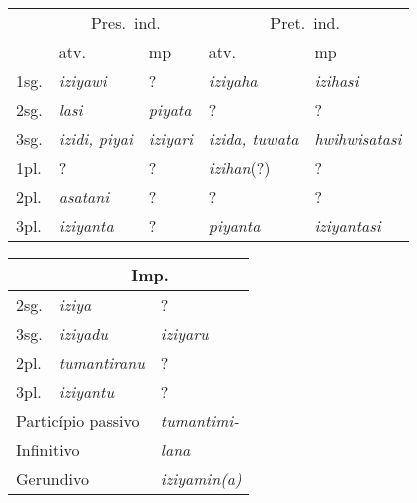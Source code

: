 \begin{center}
	\begin{tabular}[c]{lll|ll}
		\toprule
		     & \multicolumn{2}{c|}{Pres.\ ind.} & \multicolumn{2}{c}{Pret.\ ind.}                                              \\

		     & atv.\emph{}                      & mp\emph{}
		     & atv.\emph{}                      & mp\emph{}                                                                    \\
		\midrule
		1sg. & \emph{iziyawi}                   & {?}\emph{}                      & \emph{iziyaha}       & \emph{izihasi}      \\
		2sg. & \emph{lasi}                      & \emph{piyata}                   & {?}\emph{}           & {?}                 \\
		3sg. & \emph{izidi, piyai}              & \emph{iziyari}                  & \emph{izida, tuwata} & \emph{hwihwisatasi} \\
		1pl. & {?}                              & {?}                             & \emph{izihan}{(?)}   & {?}                 \\
		2pl. & \emph{asatani}                   & {?}                             & {?}                  & {?}                 \\
		3pl. & \emph{iziyanta}                  & {?}                             & \emph{piyanta}       & \emph{iziyantasi}   \\
		\bottomrule
	\end{tabular}
\end{center}


\begin{center}
	\begin{tabular}[c]{lll}
		\toprule
		                                        & \multicolumn{2}{c}{Imp.}                  \\
		\midrule
		2sg.                                    & \emph{iziya}             & {?}            \\
		3sg.                                    & \emph{iziyadu}           & \emph{iziyaru} \\
		2pl.                                    & \emph{tumantiranu}       & {?}            \\
		3pl.                                    & \emph{iziyantu}          & {?}            \\
		\midrule
		\midrule
		\multicolumn{2}{l}{Particípio  passivo} & {\emph{tumantimi-}}                       \\
		\multicolumn{2}{l}{Infinitivo}          & {\emph{lana}}                             \\
		\multicolumn{2}{l}{Gerundivo}           & {\emph{iziyamin{(a)}}}                    \\
		\bottomrule
	\end{tabular}
\end{center}


